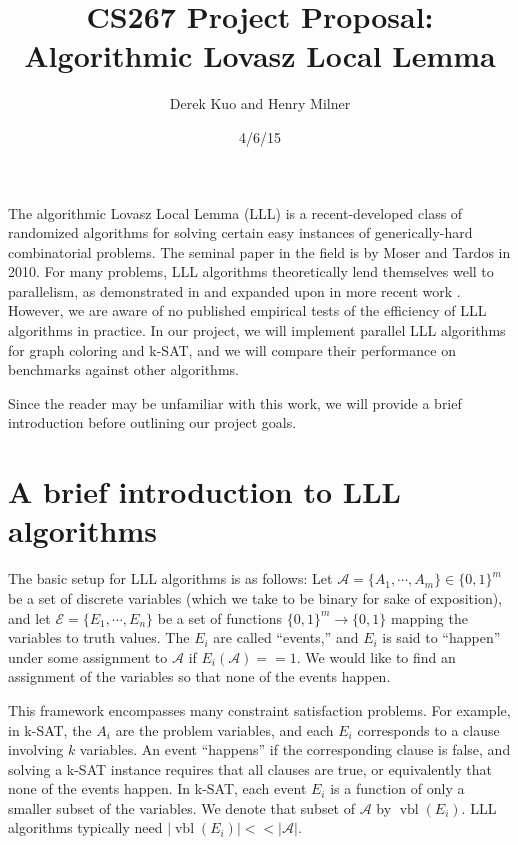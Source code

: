 \documentclass{article}
\author{Derek Kuo and Henry Milner}
\title{CS267 Project Proposal: Algorithmic Lovasz Local Lemma}
\date{4/6/15}
\begin{document}
\maketitle

The algorithmic Lovasz Local Lemma (LLL) is a recent-developed class of randomized algorithms for solving certain easy instances of generically-hard combinatorial problems.  The seminal paper in the field is by Moser and Tardos \cite{moser2010constructive} in 2010.  For many problems, LLL algorithms theoretically lend themselves well to parallelism, as demonstrated in \cite{moser2010constructive} and expanded upon in more recent work \cite{chung2014distributed,haeupler2011new}.  However, we are aware of no published empirical tests of the efficiency of LLL algorithms in practice.  In our project, we will implement parallel LLL algorithms for graph coloring and k-SAT, and we will compare their performance on benchmarks against other algorithms.

Since the reader may be unfamiliar with this work, we will provide a brief introduction before outlining our project goals.

\section{A brief introduction to LLL algorithms}
The basic setup for LLL algorithms is as follows: Let $\mathcal{A} = \{A_1, \cdots, A_m\} \in \{0,1\}^m$ be a set of discrete variables (which we take to be binary for sake of exposition), and let $\mathcal{E} = \{E_1, \cdots, E_n\}$ be a set of functions $\{0,1\}^m \to \{0,1\}$ mapping the variables to truth values.  The $E_i$ are called ``events,'' and $E_i$ is said to ``happen'' under some assignment to $\mathcal{A}$ if $E_i(\mathcal{A}) == 1$.  We would like to find an assignment of the variables so that none of the events happen.

This framework encompasses many constraint satisfaction problems.  For example, in k-SAT, the $A_i$ are the problem variables, and each $E_i$ corresponds to a clause involving $k$ variables.  An event ``happens'' if the corresponding clause is false, and solving a k-SAT instance requires that all clauses are true, or equivalently that none of the events happen.  In k-SAT, each event $E_i$ is a function of only a smaller subset of the variables.  We denote that subset of $\mathcal{A}$ by $\operatorname{vbl}(E_i)$.  LLL algorithms typically need $|\operatorname{vbl}(E_i)| << |\mathcal{A}|$.
\end{document}
